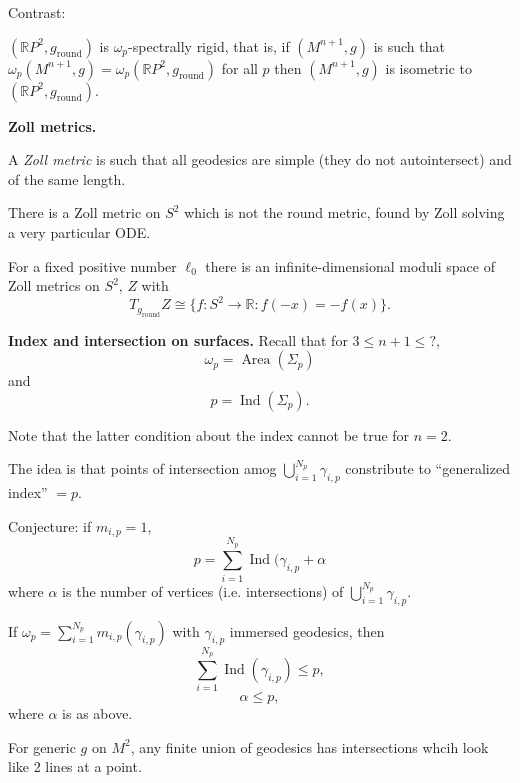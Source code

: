 \noindent
Contrast:
\begin{theorem}[Ambrosio-M-N]
\label{theorem-amn}
$(\mathbb{R}P^2,g_{\operatorname{round}})$
is $\omega_p$-spectrally rigid, that is,
if $(M^{n+1},g)$ is such that
$\omega_p(M^{n+1},g)=\omega_p(\mathbb{R}P^2,g_{\operatorname{round}})$
for all $p$ then
$(M^{n+1},g)$ is isometric to
$(\mathbb{R}P^2,g_{\operatorname{round}})$.
\end{theorem}

\medskip\noindent
{\bf Zoll metrics.}

 \begin{definition}
\label{definition-zoll-metric}
A {\it Zoll metric} is such
that all geodesics are simple 
(they do not autointersect) and of the
same length.
\end{definition}

\noindent
There is a Zoll metric on $S^2$ which is
not the round metric, found by Zoll
solving a very particular ODE.

\begin{theorem}[G-F]
\label{theorem-gf-moduli}
For a fixed positive number $\ell_0$
there is an infinite-dimensional moduli
space of Zoll metrics on $S^2$, $Z$
with
$$
T_{g_{\operatorname{round}}}Z
\cong
\{f:S^2 \to \mathbb{R}:
f(-x) = -f(x)\}.
$$
\end{theorem}

\medskip\noindent
{\bf Index and intersection on surfaces.}
Recall that for $3 \leq  n+1 \leq  ?$,
$$
\omega_p = \operatorname{Area}(\Sigma_p)
$$
and
$$
p = \operatorname{Ind}(\Sigma_p).
$$

Note that the latter condition about
the index cannot be true for $n=2$.

The idea is that points of intersection
amog $\bigcup_{i=1}^{N_p}\gamma_{i,p}$
constribute to ``generalized index'' $=p$.

Conjecture: if $m_{i,p}=1$,
$$
p=\sum_{i=1}^{N_p}\operatorname{Ind}(\gamma_{i,p}+
\alpha
$$
where $\alpha$ is the number of vertices
(i.e. intersections)
of $\bigcup_{i=1}^{N_p}\gamma_{i,p}$.

\begin{theorem}[MK-S-S]
\label{theorem-mkss}
If $\omega_p =
\sum_{i=1}^{N_p}m_{i,p}(\gamma_{i,p})$
with $\gamma_{i,p}$ immersed geodesics,
then
$$
\sum_{i=1}^{N_p}\operatorname{Ind}(\gamma_{i,p})
\leq p,
$$
$$
\alpha \leq  p,
$$
where $\alpha$ is as above.
\end{theorem}

\begin{theorem}
\label{theorem-geodesics-intersect}
For generic $g$ on $M^2$,
any finite union of geodesics has
intersections
whcih look like 2 lines at a point.
\end{theorem}

